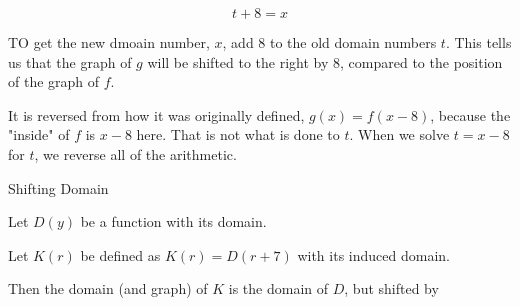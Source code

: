 \documentclass{ximera}
\begin{document}
\[ t+8=x \]

TO get the new dmoain number, $x$, add $8$ to the old domain numbers $t$.  This tells us that the graph of $g$ will be shifted to the right by $8$, compared to the position of the graph of $f$.


It is reversed from how it was originally defined, $g(x) = f(x-8)$, because the "inside" of $f$ is $x-8$ here.  That is not what is done to $t$.  When we solve $t=x-8$ for $t$, we reverse all of the arithmetic.




\begin{example} Shifting Domain


Let $D(y)$ be a function with its domain.

Let $K(r)$ be defined as $K(r) = D(r+7)$ with its induced domain.


Then the domain (and graph) of $K$ is the domain of $D$, but shifted  by 







\end{example}
\end{document}

